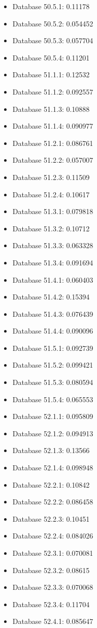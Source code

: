 \begin{itemize}
\item Database 50.5.1: 0.11178
\item Database 50.5.2: 0.054452
\item Database 50.5.3: 0.057704
\item Database 50.5.4: 0.11201
\item Database 51.1.1: 0.12532
\item Database 51.1.2: 0.092557
\item Database 51.1.3: 0.10888
\item Database 51.1.4: 0.090977
\item Database 51.2.1: 0.086761
\item Database 51.2.2: 0.057007
\item Database 51.2.3: 0.11509
\item Database 51.2.4: 0.10617
\item Database 51.3.1: 0.079818
\item Database 51.3.2: 0.10712
\item Database 51.3.3: 0.063328
\item Database 51.3.4: 0.091694
\item Database 51.4.1: 0.060403
\item Database 51.4.2: 0.15394
\item Database 51.4.3: 0.076439
\item Database 51.4.4: 0.090096
\item Database 51.5.1: 0.092739
\item Database 51.5.2: 0.099421
\item Database 51.5.3: 0.080594
\item Database 51.5.4: 0.065553
\item Database 52.1.1: 0.095809
\item Database 52.1.2: 0.094913
\item Database 52.1.3: 0.13566
\item Database 52.1.4: 0.098948
\item Database 52.2.1: 0.10842
\item Database 52.2.2: 0.086458
\item Database 52.2.3: 0.10451
\item Database 52.2.4: 0.084026
\item Database 52.3.1: 0.070081
\item Database 52.3.2: 0.08615
\item Database 52.3.3: 0.070068
\item Database 52.3.4: 0.11704
\item Database 52.4.1: 0.085647

\end{itemize}
